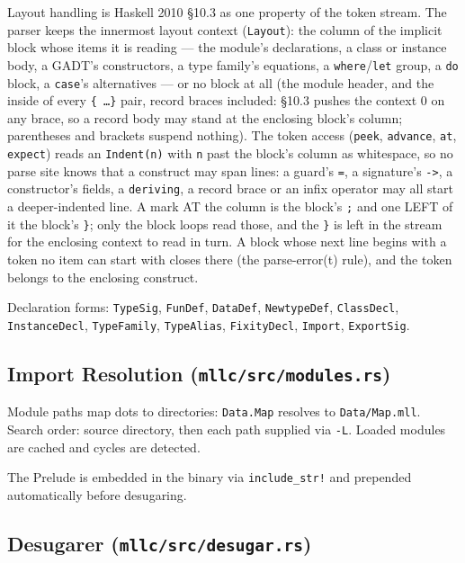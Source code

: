 \documentclass[11pt,a4paper]{article}
\begin{document}
Layout handling is Haskell 2010 \S10.3 as one property of the token stream.
The parser keeps the innermost layout context (\texttt{Layout}): the column of
the implicit block whose items it is reading --- the module's declarations, a
class or instance body, a GADT's constructors, a type family's equations, a
\texttt{where}/\texttt{let} group, a \texttt{do} block, a \texttt{case}'s
alternatives --- or no block at all (the module header, and the inside of
every \texttt{\{ \ldots \}} pair, record braces included: \S10.3 pushes
the context 0 on any brace, so a record body may stand at the enclosing
block's column; parentheses and brackets suspend nothing).  The token access
(\texttt{peek}, \texttt{advance}, \texttt{at}, \texttt{expect}) reads an
\texttt{Indent(n)} with \texttt{n} past the block's column as whitespace, so
no parse site knows that a construct may span lines: a guard's \texttt{=}, a
signature's \texttt{->}, a constructor's fields, a \texttt{deriving}, a record
brace or an infix operator may all start a deeper-indented line.  A mark AT the
column is the block's \texttt{;} and one LEFT of it the block's \texttt{\}};
only the block loops read those, and the \texttt{\}} is left in the stream for
the enclosing context to read in turn.  A block whose next line begins with a
token no item can start with closes there (the parse-error(t) rule), and the
token belongs to the enclosing construct.

Declaration forms: \texttt{TypeSig}, \texttt{FunDef}, \texttt{DataDef},
\texttt{NewtypeDef}, \texttt{ClassDecl}, \texttt{InstanceDecl},
\texttt{TypeFamily}, \texttt{TypeAlias}, \texttt{FixityDecl}, \texttt{Import},
\texttt{ExportSig}.

\subsection{Import Resolution (\texttt{mllc/src/modules.rs})}

Module paths map dots to directories: \texttt{Data.Map} resolves to
\texttt{Data/Map.mll}.  Search order: source directory, then each path supplied
via \texttt{-L}.  Loaded modules are cached and cycles are detected.

The Prelude is embedded in the binary via \texttt{include\_str!} and
prepended automatically before desugaring.

\subsection{Desugarer (\texttt{mllc/src/desugar.rs})}
\end{document}
